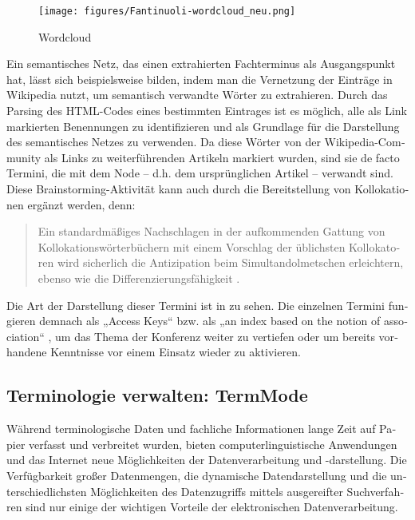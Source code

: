 \documentclass[output=paper]{LSP/langsci}
\begin{document}
\begin{otherlanguage}{ngerman}
\begin{figure}
\texttt{[image: figures/Fantinuoli-wordcloud\_neu.png]}
\caption{Wordcloud}
\label{fig:fantinuoli:4}
\end{figure} 

Ein semantisches Netz, das einen extrahierten Fachterminus als Ausgangspunkt hat, lässt sich beispielsweise bilden, indem man die Vernetzung der Einträge in Wikipedia nutzt, um semantisch verwandte Wörter zu extrahieren. Durch das Parsing des HTML-Codes eines bestimmten Eintrages ist es möglich, alle als Link markierten Benennungen zu identifizieren und als Grundlage für die Darstellung des semantisches Netzes zu verwenden. Da diese Wörter von der Wikipedia-Community als Links zu weiterführenden Artikeln markiert wurden, sind sie de facto Termini, die mit dem Node -- d.h. dem ursprünglichen Artikel -- verwandt sind. Diese Brainstorming-Aktivität kann auch durch die Bereitstellung von Kollokationen ergänzt werden, denn: 

\begin{quote}
Ein standardmäßiges Nachschlagen in der aufkommenden Gattung von Kollokationswörterbüchern mit einem Vorschlag der üblichsten Kollokatoren wird sicherlich die Antizipation beim Simultandolmetschen erleichtern, ebenso wie die Differenzierungsfähigkeit \citep[58]{Stoll2009}.
\end{quote}

Die Art der Darstellung dieser Termini ist in  zu sehen. Die einzelnen Termini fungieren demnach als „Access Keys“ bzw. als „an index based on the notion of association“  \citep[201]{Zock2010}, um das Thema der Konferenz weiter zu vertiefen oder um bereits vorhandene Kenntnisse vor einem Einsatz wieder zu aktivieren.

\subsection{Terminologie verwalten: TermMode}\label{sec:fantinuoli:6.2}

Während terminologische Daten und fachliche Informationen lange Zeit auf Papier verfasst und verbreitet wurden, bieten computerlinguistische Anwendungen und das Internet neue Möglichkeiten der Datenverarbeitung und -darstellung. Die Verfügbarkeit großer Datenmengen, die dynamische Datendarstellung und die unterschiedlichsten Möglichkeiten des Datenzugriffs mittels ausgereifter Suchverfahren sind nur einige der wichtigen Vorteile der elektronischen Datenverarbeitung.


\end{otherlanguage}
\end{document}
